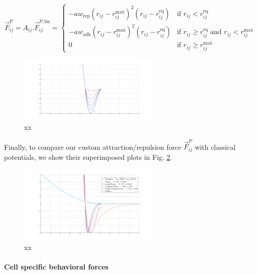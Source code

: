 $$\vec{F}^P_{ij} = A_{ij}.\vec{F}^{P,\mathrm{lin}}_{ij} = \begin{cases} - aw_{\mathrm{rep}}(r_{ij}-r^{\mathrm{max}}_{ij})^2(r_{ij}-r^{\mathrm{eq}}_{ij}) & \text{if }r_{ij} \lt r^{\mathrm{eq}}_{ij} \\ - aw_{\mathrm{adh}}(r_{ij}-r^{\mathrm{max}}_{ij})^2(r_{ij}-r^{\mathrm{eq}}_{ij}) & \text{if }r_{ij} \geq r^{\mathrm{eq}}_{ij} \;\text{and }r_{ij} \lt r^{\mathrm{max}}_{ij} \\ 0 & \text{if }r_{ij} \geq r^{\mathrm{max}}_{ij} \end{cases}$$
\begin{figure}
\begin{center}
\includegraphics[width=0.6\textwidth]{../../images/MECAGEN/potential/potential_linear_force_scale.png}
\end{center}
\caption{xx}
\label{potential_potential_linear_force_scale}
\end{figure}

Finally, to compare our custom attraction/repulsion force $\vec{F}^P_{ij}$ with classical potentials, we show their superimposed plots in Fig. \ref{potential_potential_superpose}.
\begin{figure}
\begin{center}
\includegraphics[width=0.6\textwidth]{../../images/MECAGEN/potential/potential_superpose.png}
\end{center}
\caption{xx}
\label{potential_potential_superpose}
\end{figure}

\paragraph{Cell specific behavioral forces}


